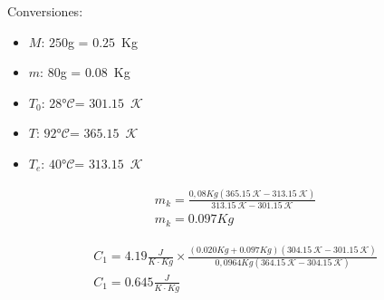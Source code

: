 \documentclass[letterpaper, 12pt]{article}
\newcommand{\Celsius}[0]{°$\mathcal{C}$}
\newcommand{\Kelvin}[0]{$\mathcal{K}$}
\begin{document}
Conversiones:

\begin{itemize}
      \item $M$: $250$g = $0.25$~Kg
      \item $m$: $80$g = $0.08$~Kg
      \item $T_{0}$: $28$\Celsius = $301.15$~\Kelvin
      \item $T$: $92$\Celsius = $365.15$~\Kelvin
      \item $T_{e}$: $40$\Celsius = $313.15$~\Kelvin
\end{itemize}

\begin{equation*}
      \begin{gathered}
            m_k = \frac{0,08 Kg(365.15~\mathcal{K} - 313.15~\mathcal{K})}{313.15~\mathcal{K} - 301.15~\mathcal{K}} \\
            m_k = 0.097 Kg
      \end{gathered}
\end{equation*}

\begin{equation*}
      \begin{gathered}
            C_{1} = 4.19 \frac{J}{K \cdot Kg} \times \frac{(0.020 Kg + 0.097 Kg)(304.15~\mathcal{K} - 301.15~\mathcal{K})}{0,0964 Kg(364.15~\mathcal{K} - 304.15~\mathcal{K})} \\
            C_{1} = 0.645 \frac{J}{K \cdot Kg}
      \end{gathered}
\end{equation*}

\subsubsection{}
\end{document}
